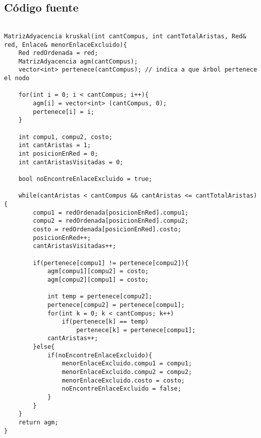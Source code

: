 \subsection{C\'odigo fuente}

\begin{lstlisting}

MatrizAdyacencia kruskal(int cantCompus, int cantTotalAristas, Red& red, Enlace& menorEnlaceExcluido){
    Red redOrdenada = red;
    MatrizAdyacencia agm(cantCompus);
    vector<int> pertenece(cantCompus); // indica a que árbol pertenece el nodo
 
    for(int i = 0; i < cantCompus; i++){
        agm[i] = vector<int> (cantCompus, 0);
        pertenece[i] = i;
    }
 
    int compu1, compu2, costo;
    int cantAristas = 1;
    int posicionEnRed = 0;
    int cantAristasVisitadas = 0;

    bool noEncontreEnlaceExcluido = true;

    while(cantAristas < cantCompus && cantAristas <= cantTotalAristas){
        compu1 = redOrdenada[posicionEnRed].compu1;
        compu2 = redOrdenada[posicionEnRed].compu2;
        costo = redOrdenada[posicionEnRed].costo;
        posicionEnRed++;
        cantAristasVisitadas++;

        if(pertenece[compu1] != pertenece[compu2]){
            agm[compu1][compu2] = costo;
            agm[compu2][compu1] = costo;
 
        	int temp = pertenece[compu2];
        	pertenece[compu2] = pertenece[compu1];
        	for(int k = 0; k < cantCompus; k++)
        		if(pertenece[k] == temp)
        			pertenece[k] = pertenece[compu1]; 
            cantAristas++;
        }else{
            if(noEncontreEnlaceExcluido){
                menorEnlaceExcluido.compu1 = compu1;
                menorEnlaceExcluido.compu2 = compu2;
                menorEnlaceExcluido.costo = costo;
                noEncontreEnlaceExcluido = false;
            }
        }
    }
    return agm;
}





\end{lstlisting}



